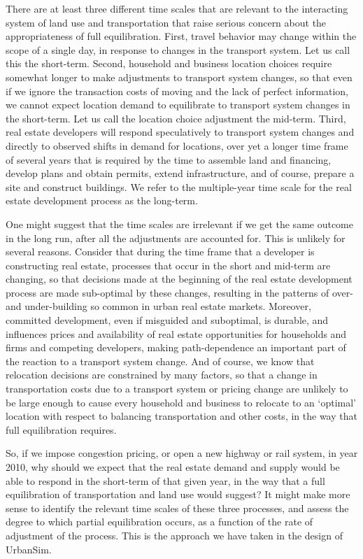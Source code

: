 \documentclass[fleqn]{article}
\begin{document}
There are at least three different time scales that are relevant
to the interacting system of land use and transportation that
raise serious concern about the appropriateness of full
equilibration. First, travel behavior may change within the scope
of a single day, in response to changes in the transport system.
Let us call this the short-term.  Second, household and business
location choices require somewhat longer to make adjustments to
transport system changes, so that even if we ignore the
transaction costs of moving and the lack of perfect information,
we cannot expect location demand to equilibrate to transport
system changes in the short-term.  Let us call the location choice
adjustment the mid-term.  Third, real estate developers will
respond speculatively to transport system changes and directly to
observed shifts in demand for locations, over yet a longer time
frame of several years that is required by the time to assemble
land and financing, develop plans and obtain permits, extend
infrastructure, and of course, prepare a site and construct
buildings.  We refer to the multiple-year time scale for the real
estate development process as the long-term.

One might suggest that the time scales are irrelevant if we get
the same outcome in the long run, after all the adjustments are
accounted for.  This is unlikely for several reasons. Consider
that during the time frame that a developer is constructing real
estate, processes that occur in the short and mid-term are
changing, so that decisions made at the beginning of the real
estate development process are made sub-optimal by these changes,
resulting in the patterns of over- and under-building so common in
urban real estate markets. Moreover, committed development, even
if misguided and suboptimal, is durable, and influences prices and
availability of real estate opportunities for households and firms
and competing developers, making path-dependence an important part
of the reaction to a transport system change.  And of course, we
know that relocation decisions are constrained by many factors, so
that a change in transportation costs due to a transport system or
pricing change are unlikely to be large enough to cause every
household and business to relocate to an `optimal' location with
respect to balancing transportation and other costs, in the way
that full equilibration requires.

So, if we impose congestion pricing, or open a new highway or rail
system, in year 2010, why should we expect that the real estate
demand and supply would be able to respond in the short-term of
that given year, in the way that a full equilibration of
transportation and land use would suggest?  It might make more
sense to identify the relevant time scales of these three
processes, and assess the degree to which partial equilibration
occurs, as a function of the rate of adjustment of the process.
This is the approach we have taken in the design of
UrbanSim.
\end{document}
